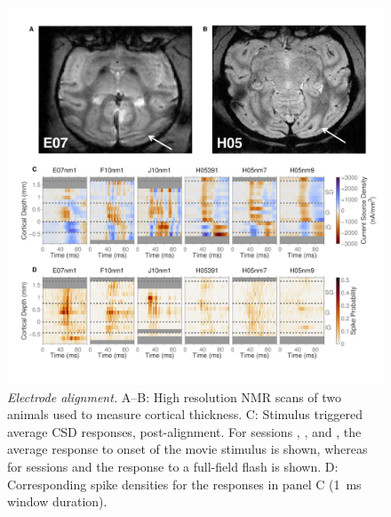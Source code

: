 \begin{figure}
\centering \includegraphics[width=\columnwidth]{paperfigs/figS1}
%
\caption{%
\textit{Electrode alignment.}
A--B: High resolution \ac{NMR} scans of two animals used to measure cortical thickness.
C: Stimulus triggered average \ac{CSD} responses, post-alignment.
For sessions , ,  and , the average response to onset of the movie stimulus is shown, whereas for sessions  and  the response to a full-field flash is shown.
D: Corresponding spike densities for the responses in panel C (\SI{1}{\milli\second} window duration).
}
\label{fig:lam_s1}
%
\end{figure}


